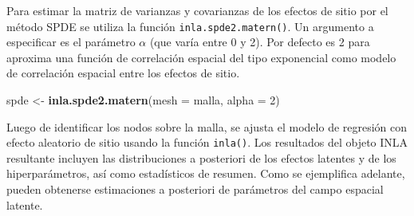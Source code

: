 \documentclass[11pt,b5paper,]{krantz}
\newenvironment{Shaded}{}{}
\newcommand{\KeywordTok}[1]{\textcolor[rgb]{0.00,0.44,0.13}{\textbf{#1}}}
\newcommand{\DataTypeTok}[1]{\textcolor[rgb]{0.56,0.13,0.00}{#1}}
\newcommand{\DecValTok}[1]{\textcolor[rgb]{0.25,0.63,0.44}{#1}}
\newcommand{\StringTok}[1]{\textcolor[rgb]{0.25,0.44,0.63}{#1}}
\newcommand{\OperatorTok}[1]{\textcolor[rgb]{0.40,0.40,0.40}{#1}}
\newcommand{\NormalTok}[1]{#1}
\begin{document}
\begin{Shaded}
\end{Shaded}

Para estimar la matriz de varianzas y covarianzas de los efectos de
sitio por el método SPDE se utiliza la función
\texttt{inla.spde2.matern()}. Un argumento a especificar es el parámetro
\(\alpha\) (que varía entre 0 y 2). Por defecto es 2 para aproxima una
función de correlación espacial del tipo exponencial como modelo de
correlación espacial entre los efectos de sitio.

\begin{Shaded}
\begin{Highlighting}[]
\NormalTok{spde <-}\StringTok{ }\KeywordTok{inla.spde2.matern}\NormalTok{(}\DataTypeTok{mesh =}\NormalTok{ malla,}
                          \DataTypeTok{alpha =} \DecValTok{2}\NormalTok{)}
\end{Highlighting}
\end{Shaded}

Luego de identificar los nodos sobre la malla, se ajusta el modelo de
regresión con efecto aleatorio de sitio usando la función
\texttt{inla()}. Los resultados del objeto INLA resultante incluyen las
distribuciones a posteriori de los efectos latentes y de los
hiperparámetros, así como estadísticos de resumen. Como se ejemplifica
adelante, pueden obtenerse estimaciones a posteriori de parámetros del
campo espacial latente.
\end{document}
